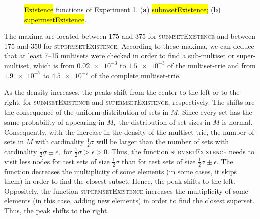 \documentclass[algorithms,article,accept,pdftex,moreauthors]{Definitions/mdpi}
\begin{document}
\begin{figure}[H]
	\caption{\hl{Existence} %
 functions of Experiment 1. (\textbf{a}) \hl{submsetExistence;} %
 (\textbf{b}) \hl{supermsetExistence}.  \label{fig:4}}
\end{figure}

The maxima are located between 175 and 375 for \textsc{submsetExistence} and 
between 175 and 350 for \textsc{supermsetExistence}. According to these maxima,
we can deduce that at least 7--15 multisets were checked in order to find 
a sub-multiset or super-multiset, which is from $\num{0.02e-3}$ to $\num{1.5e-3}$ of the 
multiset-trie and from $\num{1.9e-7}$ to $\num{4.5e-7}$ of the complete 
multiset-trie.

As the density increases, the peaks shift from the center to the left or to the right, 
for \textsc{submsetExistence} and \textsc{supermsetExistence}, respectively. 
The shifts are the consequence of the uniform distribution of sets in $M.$ 
Since every set has the same probability of appearing in $M,$ the distribution of set 
sizes in $M$ is normal. Consequently, with the increase in the density of the 
multiset-trie, the number of sets in $M$ with cardinality $\frac{1}{2}\sigma$ will be 
larger than the number of sets with cardinality $\frac{1}{2}\sigma\pm\epsilon,$ 
for $\frac{1}{2}\sigma > \epsilon > 0.$ Thus, the function \textsc{submsetExistence} 
needs to visit less nodes for test sets of size $\frac{1}{2}\sigma$ than for test 
sets of size $\frac{1}{2}\sigma\pm\epsilon.$ The function decreases the 
multiplicity of some elements (in some cases, it skips them) in order to find the 
closest subset. Hence, the peak shifts to the left. Oppositely, the function 
\textsc{supermsetExistence} increases the multiplicity of some elements 
(in this case, adding new elements) in order to find the closest superset. 
Thus, the peak shifts to the right.
\end{document}
